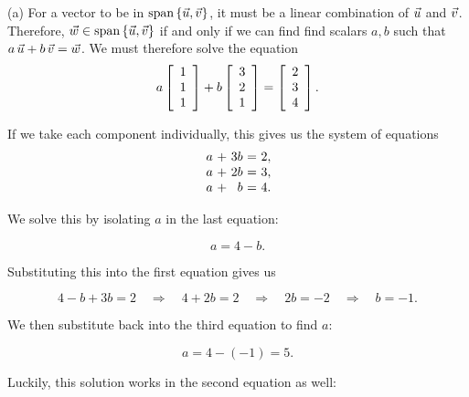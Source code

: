 \documentclass{ximera}
\begin{document}
\begin{exploration}
\begin{example}
\begin{solution}
\end{solution}

  \begin{solution}
    (a) For a vector to be in $\sspan\set{\vect{u},\vect{v}}$, it must
    be a linear combination of $\vect{u}$ and $\vect{v}$. Therefore,
    $\vect{w}\in\sspan\set{\vect{u},\vect{v}}$ if and only if we can
    find find scalars $a,b$ such that
    $a\,\vect{u} + b\,\vect{v} = \vect{w}$. We must therefore solve the
    equation
    \begin{equation*}
      a \startmat{r} 1 \\ 1 \\ 1 \stopmat
      + b \startmat{r} 3 \\ 2 \\ 1 \stopmat
      = \startmat{r} 2 \\ 3 \\ 4 \stopmat.
    \end{equation*}
   
    If we take each component individually, this gives us the system of equations
    \begin{equation*}
      \begin{array}{r@{~}c@{~}r@{~}c@{~}r@{~}r}
        a & + & 3b & = & 2, \\
        a & + & 2b & = & 3, \\
        a & + & b & = & 4.
      \end{array}
    \end{equation*}

    We solve this by isolating $a$ in the last equation: 

    \begin{equation*}
      a = 4 - b.
    \end{equation*}

    Substituting this into the first equation gives us

    \begin{equation*}
      4 - b + 3b = 2 \quad \Rightarrow \quad 4 + 2b = 2 \quad \Rightarrow \quad 2b = -2 \quad \Rightarrow \quad b = -1.
    \end{equation*}

    We then substitute back into the third equation to find $a$:

    \begin{equation*}
      a = 4 - (-1) = 5.
    \end{equation*}

    Luckily, this solution works in the second equation as well:


\end{solution}
\end{example}
\end{exploration}
\end{document}
